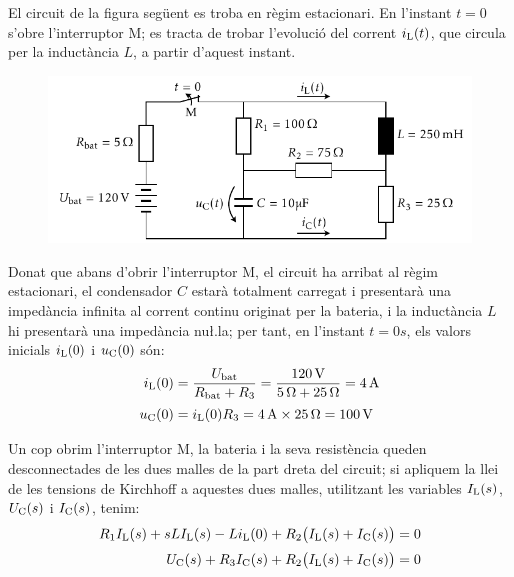 \begin{exemple}

El circuit de la figura seg\"{u}ent es troba en r\`{e}gim estacionari. En
l'instant $t=0$ s'obre l'interruptor M; es tracta de trobar
l'evoluci\'{o} del corrent $i_\mathrm{L}(t)$, que circula per la induct\`{a}ncia
$L$, a partir d'aquest instant.

\begin{figure}[h]
    \centering
    \includegraphics{Imatges/Cap-Laplace-Exemple3-Circuit.pdf}
\end{figure}

 Donat que abans d'obrir l'interruptor M, el circuit ha arribat al
 r\`{e}gim estacionari, el condensador $C$ estar\`{a} totalment carregat  i
 presentar\`{a} una imped\`{a}ncia infinita al corrent continu originat per la
 bateria, i la induct\`{a}ncia $L$ hi presentar\`{a} una imped\`{a}ncia nu{\l.l}a;
 per tant, en l'instant $t=0\unit{s}$, els valors inicials $i_\mathrm{L}(0)$ i
 $u_\mathrm{C}(0)$ s\'{o}n:
 \begin{align*}
    i_\mathrm{L}(0) &= \frac{U_\mathrm{bat}}{R_\mathrm{bat} + R_3} = \frac{120\mathrm{\,V}}
    {5\mathrm{\,\mathrm{\Omega}} + 25\mathrm{\,\mathrm{\Omega}}} = 4\mathrm{\,A} \\[0.5ex]
    u_\mathrm{C}(0) &= i_\mathrm{L}(0) R_3 = 4\mathrm{\,A}\times 25\mathrm{\,\mathrm{\Omega}} = 100\mathrm{\,V}
 \end{align*}

Un cop obrim l'interruptor M, la bateria i la seva resist\`{e}ncia
queden desconnectades de les dues malles de la part dreta del circuit; si apliquem la llei de les tensions de Kirchhoff  a aquestes
dues malles, utilitzant les variables $I_\mathrm{L}(s)$, $U_\mathrm{C}(s)$ i
$I_\mathrm{C}(s)$, tenim:
\begin{align*}
    R_1 I_\mathrm{L}(s) + s L I_\mathrm{L}(s) - L i_\mathrm{L}(0) + R_2
    \bigl(I_\mathrm{L}(s) + I_\mathrm{C}(s)\bigr) &=0 \\[0.5ex]
    U_\mathrm{C}(s) + R_3 I_\mathrm{C}(s) + R_2 \bigl(I_\mathrm{L}(s) + I_\mathrm{C}(s)\bigr) &=0
\end{align*}


\end{exemple}
